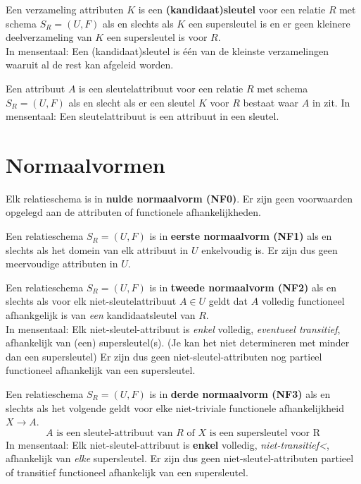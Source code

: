 \documentclass[normaalvormen.tex]{subfiles}
\begin{document}
\begin{de}
Een verzameling attributen $K$ is een \textbf{(kandidaat)sleutel}  voor een relatie $R$ met schema $S_{R} = (U,F)$ als en slechts als $K$ een supersleutel is en er geen kleinere deelverzameling van $K$ een supersleutel is voor $R$.\\
In mensentaal: Een (kandidaat)sleutel is \'e\'en van de kleinste verzamelingen waaruit al de rest kan afgeleid worden.
\end{de}

\begin{de}
Een attribuut $A$ is een sleutelattribuut voor een relatie $R$ met schema $S_{R} = (U,F)$ als en slecht als er een sleutel $K$ voor $R$ bestaat waar $A$ in zit.
In mensentaal: Een sleutelattribuut is een attribuut in een sleutel.
\end{de}

\section{Normaalvormen}
\begin{de}
Elk relatieschema is in \textbf{nulde normaalvorm (NF0)}. Er zijn geen voorwaarden opgelegd aan de attributen of functionele afhankelijkheden.
\end{de}

\begin{de}
Een relatieschema $S_{R} = (U,F)$ is in \textbf{eerste normaalvorm (NF1)} als en slechts als het domein van elk attribuut in $U$ enkelvoudig is. Er zijn dus geen meervoudige attributen in $U$.
\end{de}

\begin{de}
Een relatieschema $S_{R} = (U,F)$ is in \textbf{tweede normaalvorm (NF2)} als en slechts als voor elk niet-sleutelattribuut $A \in U$ geldt dat $A$ volledig functioneel afhankgelijk is van \emph{een} kandidaatsleutel van $R$.\\
In mensentaal: Elk niet-sleutel-attribuut is \emph{enkel} volledig, \emph{eventueel transitief}, afhankelijk van (een) supersleutel(s). (Je kan het niet determineren met minder dan een supersleutel) Er zijn dus geen niet-sleutel-attributen nog partieel functioneel afhankelijk van een supersleutel.
\end{de}

\begin{de}
Een relatieschema $S_{R} = (U,F)$ is in \textbf{derde normaalvorm (NF3)} als en slechts als het volgende geldt voor elke niet-triviale functionele afhankelijkheid $X\rightarrow A$.
\[
A \text{ is een sleutel-attribuut van } R \text{ of } X \text{ is een supersleutel voor R}
\]
In mensentaal: Elk niet-sleutel-attribuut is \textbf{enkel} volledig, \emph{niet-transitief<}, afhankelijk van \emph{elke} supersleutel. Er zijn dus geen niet-sleutel-attributen partieel of transitief functioneel afhankelijk van een supersleutel.
\end{de}
\end{document}
